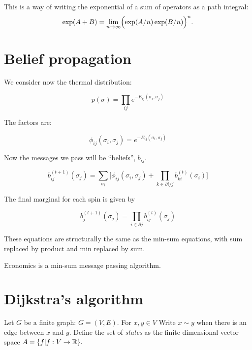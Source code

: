\documentclass[11pt]{article}
\begin{document}
This is a way of writing the exponential of a sum of operators
as a path integral:
$$
\exp(A+B) = \lim_{n\to\infty} \Bigl(\exp(A/n)\exp(B/n)\Bigr)^n.
$$
 

\section{Belief propagation}



We consider now the thermal distribution:

$$
    p(\sigma) = \prod_{ij} e^{-E_{ij}(\sigma_i, \sigma_j)}
$$

The factors are:

$$
\phi_{ij}(\sigma_i, \sigma_j) = e^{-E_{ij}(\sigma_i, \sigma_j)}
$$

Now the messages we pass will be ``beliefs'', $b_{ij}$.

$$
b_{ij}^{(t+1)}(\sigma_j) = \sum_{\sigma_i}\bigl[ \phi_{ij}(\sigma_i, \sigma_j)
  + \prod_{k\in \partial i/j} b_{ki}^{(t)}(\sigma_i) \bigr]
$$

The final marginal for each spin is given by

$$
    b_j^{(t+1)}(\sigma_j) = \prod_{i\in \partial j} b_{ij}^{(t)}(\sigma_j)
$$

These equations are structurally the same as the
min-sum equations, with sum replaced by product and
min replaced by sum.




Economics is a min-sum message passing algorithm.



%
%

\section{Dijkstra's algorithm}

Let $G$ be a finite graph: $G = (V, E).$
For $x,y\in V$ Write $x\sim y$ when there
is an edge between $x$ and $y.$ %
Define the set of \emph{states} as %
the finite dimensional vector space
$A = \{ f | f : V \to \mathbb R \}.$
\end{document}
